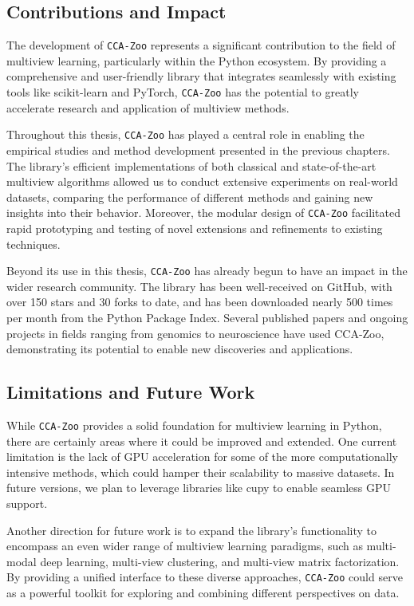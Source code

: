 \subsection{Contributions and Impact}

The development of \texttt{CCA-Zoo} represents a significant contribution to the field of multiview learning, particularly within the Python ecosystem. By providing a comprehensive and user-friendly library that integrates seamlessly with existing tools like scikit-learn and PyTorch, \texttt{CCA-Zoo} has the potential to greatly accelerate research and application of multiview methods.

Throughout this thesis, \texttt{CCA-Zoo} has played a central role in enabling the empirical studies and method development presented in the previous chapters. The library's efficient implementations of both classical and state-of-the-art multiview algorithms allowed us to conduct extensive experiments on real-world datasets, comparing the performance of different methods and gaining new insights into their behavior. Moreover, the modular design of \texttt{CCA-Zoo} facilitated rapid prototyping and testing of novel extensions and refinements to existing techniques.

Beyond its use in this thesis, \texttt{CCA-Zoo} has already begun to have an impact in the wider research community. The library has been well-received on GitHub, with over 150 stars and 30 forks to date, and has been downloaded nearly 500 times per month from the Python Package Index. Several published papers and ongoing projects in fields ranging from genomics to neuroscience have used CCA-Zoo, demonstrating its potential to enable new discoveries and applications.

\subsection{Limitations and Future Work}

While \texttt{CCA-Zoo} provides a solid foundation for multiview learning in Python, there are certainly areas where it could be improved and extended. One current limitation is the lack of GPU acceleration for some of the more computationally intensive methods, which could hamper their scalability to massive datasets. In future versions, we plan to leverage libraries like cupy to enable seamless GPU support.

Another direction for future work is to expand the library's functionality to encompass an even wider range of multiview learning paradigms, such as multi-modal deep learning, multi-view clustering, and multi-view matrix factorization. By providing a unified interface to these diverse approaches, \texttt{CCA-Zoo} could serve as a powerful toolkit for exploring and combining different perspectives on data.

